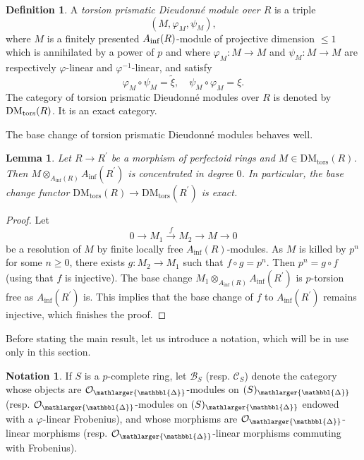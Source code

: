 \documentclass{amsart}
\newcommand{\prism}{{\mathlarger{\mathbbl{\Delta}}}}
\theoremstyle{plain}
\newtheorem{lemma}[theorem]{Lemma}
\theoremstyle{definition}
\newtheorem{definition}[theorem]{Definition}
\newtheorem{notation}[theorem]{Notation}
\renewcommand{\inf}{\mathrm{inf}}
\newcommand{\tilxi}{\tilde{\xi}}
\newcommand{\blue}[1]{{\color{black}#1}}
\begin{document}
\begin{definition}
  \label{definition-torsion-bkf-modules}
A \textit{torsion prismatic Dieudonn\'e module over $R$} is a triple
$$
(M,\varphi_M,\psi_M),
$$
where $M$ is a finitely presented $A_{\rm inf}(R)$-module of projective dimension $\leq 1$ which is annihilated by a power of $p$ and where $\varphi_M : M \to M$ and $\psi_M : M\to M$ are respectively $\varphi$-linear and $\varphi^{-1}$-linear, and satisfy $$\varphi_M \circ \psi_M=\tilxi, \quad \psi_M \circ \varphi_M=\xi.$$
The category of torsion prismatic Dieudonn\'e modules over $R$ is denoted by $\mathrm{DM}_{\rm tors}(R)$. \blue{It is an exact category.}
\end{definition}


  The base change of torsion prismatic Dieudonn\'e modules behaves well.
  
  \begin{lemma}
    \label{sec:prism-dieud-theory-lemma-base-change-for-torsion-modules}
    Let $R\to R^\prime$ be a morphism of perfectoid rings and $M\in \mathrm{DM}_{\mathrm{tors}}(R)$. Then $M\otimes_{A_\inf(R)}A_\inf(R^\prime)$ is concentrated in degree $0$. In particular, the base change functor $\mathrm{DM}_{\mathrm{tors}}(R)\to \mathrm{DM}_{\mathrm{tors}}(R^\prime)$ is exact.
  \end{lemma}
  \begin{proof}
    Let
    $$
    0\to M_1\xrightarrow{f} M_2\to M\to 0
    $$
    be a resolution of $M$ by finite locally free $A_\inf(R)$-modules. As $M$ is killed by $p^n$ for some $n\geq 0$, there exists $g\colon M_2\to M_1$ such that $f\circ g=p^n$. Then $p^n=g\circ f$ (using that $f$ is injective). The base change $M_1\otimes_{A_\inf(R)}A_\inf(R^\prime)$ is $p$-torsion free as $A_\inf(R^\prime)$ is. This implies that the base change of $f$ to $A_\inf(R^\prime)$ remains injective, which finishes the proof. 
  \end{proof}

Before stating the main result, let us introduce a notation, which will be in use only in this section.
\begin{notation}
If $S$ is a $p$-complete ring, let $\mathcal{B}_S$ (resp. $\mathcal{C}_S$) denote the category whose objects are $\mathcal{O}_{\prism}$-modules on $(S)_{\prism}$ (resp. $\mathcal{O}_{\prism}$-modules on $(S)_{\prism}$ endowed with a $\varphi$-linear Frobenius), and whose morphisms are $\mathcal{O}_{\prism}$-linear morphisms (resp. $\mathcal{O}_{\prism}$-linear morphisms commuting with Frobenius).
\end{notation}
\end{document}
